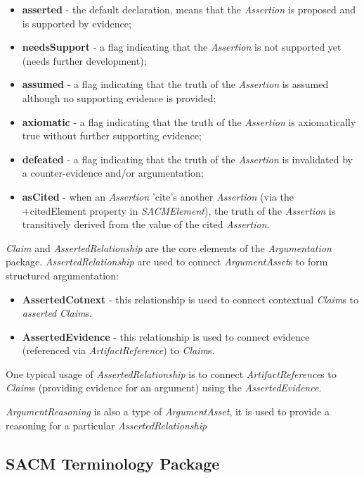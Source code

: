 \begin{itemize}
	\item \textbf{asserted} - the default declaration, means that the \textit{Assertion} is proposed and is supported by evidence;
	\item \textbf{needsSupport} - a flag indicating that the \textit{Assertion} is not supported yet (needs further development);
	\item \textbf{assumed} - a flag indicating that the truth of the \textit{Assertion} is assumed although no supporting evidence is provided;
	\item \textbf{axiomatic} - a flag indicating that the truth of the \textit{Assertion} is axiomatically true without further supporting evidence;
	\item \textbf{defeated} - a flag indicating that the truth of the \textit{Assertion} is invalidated by a counter-evidence and/or argumentation;
	\item \textbf{asCited} - when an \textit{Assertion} 'cite's another \textit{Assertion} (via the +citedElement property in \textit{SACMElement}), the truth of the \textit{Assertion} is transitively derived from the value of the cited \textit{Assertion}.
\end{itemize}

\textit{Claim} and \textit{AssertedRelationship} are the core elements of the \textit{Argumentation} package. \textit{AssertedRelationship} are used to connect \textit{ArgumentAsset}s to form structured argumentation:

\begin{itemize}
	\item \textbf{AssertedCotnext} - this relationship is used to connect contextual \textit{Claim}s to \textit{asserted} \textit{Claim}s. 
	\item \textbf{AssertedEvidence} - this relationship is used to connect evidence (referenced via \textit{ArtifactReference}) to \textit{Claim}s. 
\end{itemize}



 One typical usage of \textit{AssertedRelationship} is to connect \textit{ArtifactReference}s to \textit{Claim}s (providing evidence for an argument) using the \textit{AssertedEvidence}. 

\textit{ArgumentReasoning} is also a type of \textit{ArgumentAsset}, it is used to provide a reasoning for a particular \textit{AssertedRelationship}

\subsection{SACM Terminology Package}
\label{sec:termPack}

